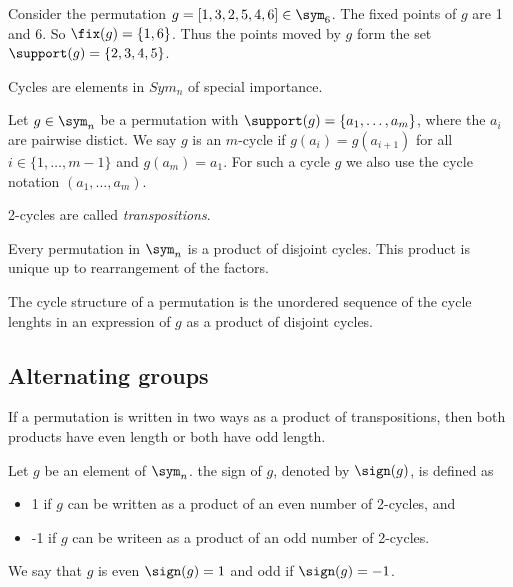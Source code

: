 \begin{example}
    Consider the permutation $g = [1, 3, 2, 5, 4, 6] \in \sym_6$.
    The fixed points of $g$ are 1 and 6. So $\fix(g) = \{1, 6\}$.
    Thus the points moved by $g$ form the set $\support(g) = \{2, 3, 4, 5\}$.
\end{example}

    Cycles are elements in $Sym_n$ of special importance.

\begin{definition}[Cycles]
    Let $ g \in \sym_n $ be a permutation with $ \support(g) = \{a_1,\dots,a_m\} $,
    where the $ a_i $ are pairwise distict. We say $g$ is an $m$-cycle if
    $ g(a_i) = g(a_{i+1}) $ for all $ i \in \{1,\dots,m-1\} $ and $ g(a_m) = a_1 $.
    For such a cycle $g$ we also use the cycle notation $ \left(a_1,\dots,a_m\right) $.

    2-cycles are called \emph{transpositions}.
\end{definition}

\begin{theorem}
    Every permutation in $ \sym_n $ is a product of disjoint cycles. This product
    is unique up to rearrangement of the factors.
\end{theorem}

\begin{definition}
    The cycle structure of a permutation is the unordered sequence of the cycle
    lenghts in an expression of $g$ as a product of disjoint cycles.
\end{definition}

\subsection{Alternating groups}
\begin{theorem}
    If a permutation is written in two ways as a product of transpositions, then
    both products have even length or both have odd length.
\end{theorem}

\begin{definition}
    Let $g$ be an element of $ \sym_n $. the sign of $g$, denoted by $ \sign(g) $,
    is defined as
    \begin{itemize}
        \item 1 if $g$ can be written as a product of an even number of 2-cycles, and
        \item -1 if $g$ can be writeen as a product of an odd number of 2-cycles.
    \end{itemize}
    We say that $g$ is even $ \sign(g) = 1 $ and odd if $ \sign(g) = -1 $.
\end{definition}


